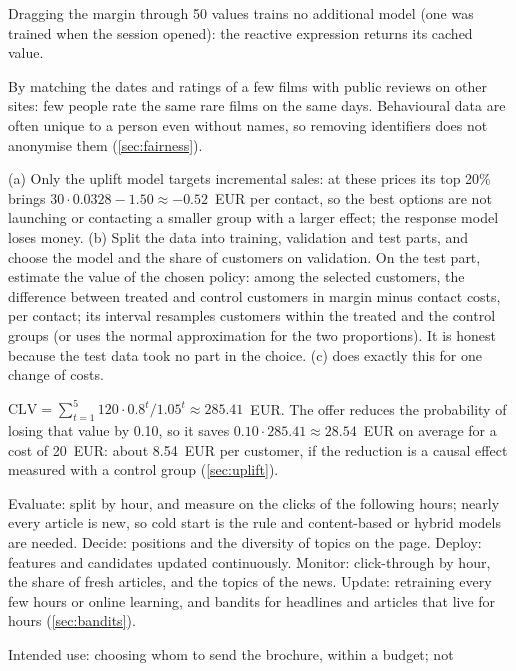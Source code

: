 \begin{description}[font=\bfseries,leftmargin=0pt,itemsep=5pt]
        Dragging the margin through 50 values trains no additional model (one was trained when the session
        opened): the reactive expression returns its cached value.
  \item[\ref{exr7:privacy}] By matching the dates and ratings of a few films with public reviews on other sites: few people rate the same rare
        films on the same days. Behavioural data are often unique to a person even without names, so removing identifiers does not anonymise
        them (\cref{sec:fairness}).
  \item[\ref{exr7:integrated}] (a) Only the uplift model targets incremental sales: at these prices its top 20\% brings
        $30\cdot0.0328-1.50\approx-0.52$~EUR per contact, so the best options are not launching or contacting a smaller group
        with a larger effect; the response model loses money. (b) Split the data into training, validation and test parts, and choose the model and the
        share of customers on validation. On the test part, estimate the value of the chosen policy: among the selected
        customers, the difference between treated and control customers in margin minus contact costs, per contact; its
        interval resamples customers within the treated and the control groups (or uses the normal approximation for the
        two proportions). It is honest because the test data took no part in the choice. (c)  does exactly this for one change of costs.
\item[\ref{exr7:clv}] $\mathrm{CLV}=\sum_{t=1}^{5}120\cdot0.8^t/1.05^t\approx285.41$~EUR. The offer reduces
the probability of losing that value by 0.10, so it saves $0.10\cdot285.41\approx28.54$~EUR on average for
a cost of 20~EUR: about 8.54~EUR per customer, if the reduction is a causal effect measured with a
control group (\cref{sec:uplift}).
\item[\ref{exr7:lifecycle}] Evaluate: split by hour, and measure on the clicks of the following hours;
nearly every article is new, so cold start is the rule and content-based or hybrid
models are needed. Decide: positions and the diversity of topics on the page. Deploy: features and
candidates updated continuously. Monitor: click-through by hour, the share of fresh articles, and the
topics of the news. Update: retraining every few hours or online learning, and bandits for headlines
and articles that live for hours (\cref{sec:bandits}).
\item[\ref{exr7:modelcard}] Intended use: choosing whom to send the brochure, within a budget; not

\end{description}
